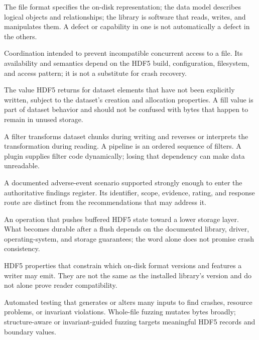 \documentclass[../main.tex]{subfiles}
\begin{document}
\begin{description}[leftmargin=1.5em,style=nextline]
\item[File format / data model / library.]
The file format specifies the on-disk representation; the data model describes
logical objects and relationships; the library is software that reads, writes,
and manipulates them. A defect or capability in one is not automatically a
defect in the others.

\item[File locking.]
Coordination intended to prevent incompatible concurrent access to a file.
Its availability and semantics depend on the HDF5 build, configuration,
filesystem, and access pattern; it is not a substitute for crash recovery.

\item[Fill value.]
The value HDF5 returns for dataset elements that have not been explicitly
written, subject to the dataset's creation and allocation properties. A fill
value is part of dataset behavior and should not be confused with bytes that
happen to remain in unused storage.

\item[Filter / filter pipeline / filter plugin.]
A filter transforms dataset chunks during writing and reverses or interprets
the transformation during reading. A pipeline is an ordered sequence of
filters. A plugin supplies filter code dynamically; losing that dependency can
make data unreadable.

\item[Finding / formal finding.]
A documented adverse-event scenario supported strongly enough to enter the
authoritative findings register. Its identifier, scope, evidence, rating, and
response route are distinct from the recommendations that may address it.

\item[Flush.]
An operation that pushes buffered HDF5 state toward a lower storage layer.
What becomes durable after a flush depends on the documented library, driver,
operating-system, and storage guarantees; the word alone does not promise
crash consistency.

\item[Format bounds / library-version bounds.]
HDF5 properties that constrain which on-disk format versions and features a
writer may emit. They are not the same as the installed library's version and
do not alone prove reader compatibility.

\item[Fuzzing / mutation.]
Automated testing that generates or alters many inputs to find crashes,
resource problems, or invariant violations. Whole-file fuzzing mutates bytes
broadly; structure-aware or invariant-guided fuzzing targets meaningful HDF5
records and boundary values.


\end{description}
\end{document}
